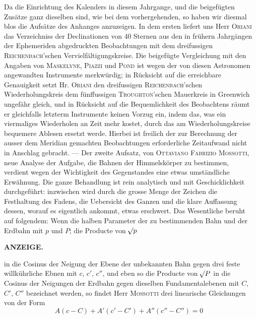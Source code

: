Da die Einrichtung des Kalenders in diesem Jahrgange, und die beigefügten Zusätze ganz dieselben sind, wie bei dem vorhergehenden, so haben wir diesmal blos die Aufsätze des Anhanges anzuzeigen. In dem ersten liefert uns Herr \textsc{Oriani} das Verzeichniss der Declinationen von 40 Sternen aus den in frühern Jahrgängen der Ephemeriden abgedruckten Beobachtungen mit dem dreifussigen \textsc{Reichenbach}'schen Vervielfältigungskreise. Die beigefügte Vergleichung mit den Angaben von \textsc{Maskelyne}, \textsc{Piazzi} und \textsc{Pond} ist wegen der von diesen Astronomen angewandten Instrumente merkwürdig; in Rücksicht auf die erreichbare Genauigkeit setzt Hr. \textsc{Oriani} den dreifussigen \textsc{Reichenbach}'schen Wiederholungskreis dem fünffussigen \textsc{Troughton}'schen Mauerkreis in Greenwich ungefähr gleich, und in Rücksicht auf die Bequemlichkeit des Beobachtens räumt er gleichfalls letzterm Instrumente keinen Vorzug ein, indem das, was ein viermaliges Wiederholen an Zeit mehr kostet, durch das am Wiederholungskreise bequemere Ablesen ersetzt werde. Hierbei ist freilich der zur Berechnung der ausser dem Meridian gemachten Beobachtungen erforderliche Zeitaufwand nicht in Anschlag gebracht. --- Der zweite Aufsatz, von \textsc{Ottaviano Fabrizio Mossotti}, neue Analyse der Aufgabe, die Bahnen der Himmelskörper zu bestimmen, verdient wegen der Wichtigkeit des Gegenstandes eine etwas umständliche Erwähnung. Die ganze Behandlung ist rein analytisch und mit Geschicklichkeit durchgeführt: inzwischen wird durch die grosse Menge der Zeichen die Festhaltung des Fadens, die Uebersicht des Ganzen und die klare Auffassung dessen, worauf es eigentlich ankommt, etwas erschwert. Das Wesentliche beruht auf folgendem: Wenn die halben Parameter der zu bestimmenden Bahn und der Erdbahn mit $p$ und $P$; die Producte von $\mathord{{}^{}\!\surd}p$\par
{}
\clearpage
\thispagestyle{empty}
\noindent{}%
%
\parbox[t]{\dimexpr\linewidth-24mm\relax}{\centering\footnotesize\bfseries ANZEIGE.\par}%
\makebox[12mm][r]{}\par\medskip
\noindent in die Cosinus der Neigung der Ebene der unbekannten Bahn gegen drei feste willkührliche Ebnen mit
$c$, $c'$, $c''$, und eben so die Producte von $\mathord{{}^{}\!\surd}P$ in die Cosinus der Neigungen der Erdbahn gegen dieselben
Fundamentalebenen mit $C$, $C'$, $C''$ bezeichnet werden, so findet Herr \textsc{Mossotti} drei linearische Gleichungen von der Form
\[
A(c-C)+A'(c'-C')+A''(c''-C'') = 0
\] 
